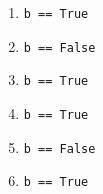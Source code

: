 \begin{multicols}{3}
\begin{enumerate}
	\item \lstinline{b == True}
	\item \lstinline{b == False}
	\item \lstinline{b == True}
	\item \lstinline{b == True}
	\item \lstinline{b == False}
	\item \lstinline{b == True}
\end{enumerate}
\end{multicols}